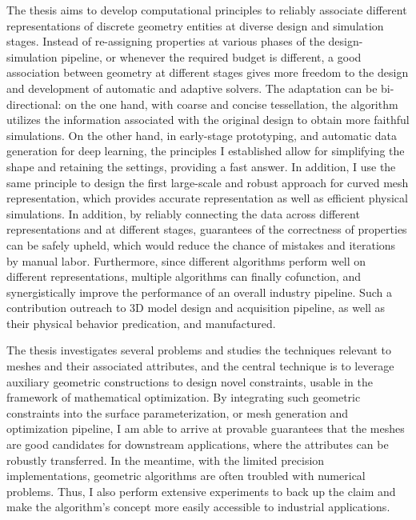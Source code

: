 The thesis aims to develop computational principles to reliably associate different representations of discrete geometry entities at diverse design and simulation stages. Instead of re-assigning properties at various phases of the design-simulation pipeline, or whenever the required budget is different, a good association between geometry at different stages gives more freedom to the design and development of automatic and adaptive solvers. The adaptation can be bi-directional: on the one hand, with coarse and concise tessellation, the algorithm utilizes the information associated with the original design to obtain more faithful simulations. On the other hand, in early-stage prototyping, and automatic data generation for deep learning, the principles I established allow for simplifying the shape and retaining the settings, providing a fast answer. In addition, I use the same principle to design the first large-scale and robust approach for curved mesh representation, which provides accurate representation as well as efficient physical simulations.
In addition, by reliably connecting the data across different representations and at different stages, guarantees of the correctness of properties can be safely upheld, which would reduce the chance of mistakes and iterations by manual labor. 
Furthermore,  since different algorithms perform well on different representations, multiple algorithms can finally cofunction, and synergistically improve the performance of an overall industry pipeline.
Such a contribution outreach to 3D model design and acquisition pipeline, as well as their physical behavior predication, and manufactured.

The thesis investigates several problems and studies the techniques relevant to meshes and their associated attributes, and the central technique is to leverage auxiliary geometric constructions to design novel constraints, usable in the framework of mathematical optimization. 
By integrating such geometric constraints into the surface parameterization, or mesh generation and optimization pipeline, I am able to arrive at provable guarantees that the meshes are good candidates for downstream applications, where the attributes can be robustly transferred.
In the meantime, with the limited precision implementations, geometric algorithms are often troubled with numerical problems. Thus, I also perform extensive experiments to back up the claim and make the algorithm's concept more easily accessible to industrial applications.

